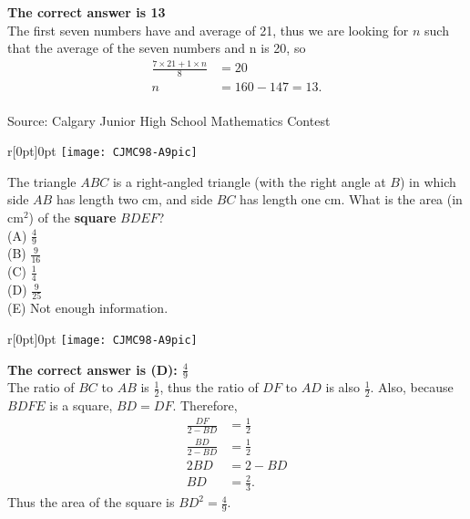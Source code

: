 \documentclass{article}
\begin{document}

\textbf{The correct answer is 13}\\[1 ex]
The first seven numbers have and average of 21, thus we are looking for $n$ such that the average of the seven numbers and n is 20, so
\begin{align*}
\frac{7\times21+1\times n}{8}&=20\\
n&=160-147=13.
\end{align*}
\\[5 ex]

\scriptsize
Source: Calgary Junior High School Mathematics Contest

\normalsize
\begin{wrapfigure}[4]{r}[0pt]{0pt}
	\texttt{[image: CJMC98-A9pic]}
\end{wrapfigure}
The triangle $ABC$ is a right-angled triangle (with the right angle at $B$) in which side $AB$
has length two cm, and side $BC$ has length one cm. What is the area (in
cm$^{2}$) of the \textbf{square} $BDEF$?\\
(A) $\frac{4}{9}$\\[1 ex]
(B) $\frac{9}{16}$\\[1 ex]
(C) $\frac{1}{4}$\\[1 ex]
(D) $\frac{9}{25}$\\[1 ex]
(E) Not enough information.\\

\begin{wrapfigure}{r}[0pt]{0pt}
	\texttt{[image: CJMC98-A9pic]}
\end{wrapfigure}

\textbf{The correct answer is (D): $\frac{4}{9}$}\\[1 ex]
The ratio of $BC$ to $AB$ is $\frac{1}{2}$, thus the ratio of $DF$ to $AD$ is also $\frac{1}{2}$. Also, because $BDFE$ is a square, $BD=DF$. Therefore, \begin{align*}
\frac{DF}{2-BD}&=\frac{1}{2}\\
\frac{BD}{2-BD}&=\frac{1}{2}\\
2BD&=2-BD\\
BD&=\frac{2}{3}.
\end{align*}
Thus the area of the square is $BD^2=\frac{4}{9}$.
\\[5 ex]
\end{document}
